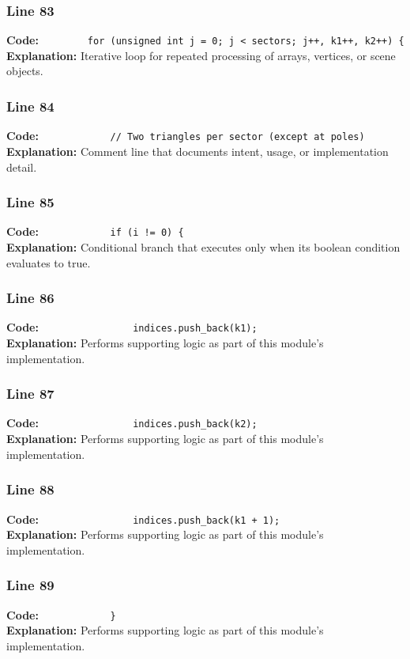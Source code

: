 \documentclass[11pt,a4paper]{article}
\begin{document}
\subsubsection*{Line 83}
\textbf{Code:} \verb|        for (unsigned int j = 0; j < sectors; j++, k1++, k2++) {|\\
\textbf{Explanation:} Iterative loop for repeated processing of arrays, vertices, or scene objects.

\subsubsection*{Line 84}
\textbf{Code:} \verb|            // Two triangles per sector (except at poles)|\\
\textbf{Explanation:} Comment line that documents intent, usage, or implementation detail.

\subsubsection*{Line 85}
\textbf{Code:} \verb|            if (i != 0) {|\\
\textbf{Explanation:} Conditional branch that executes only when its boolean condition evaluates to true.

\subsubsection*{Line 86}
\textbf{Code:} \verb|                indices.push_back(k1);|\\
\textbf{Explanation:} Performs supporting logic as part of this module's implementation.

\subsubsection*{Line 87}
\textbf{Code:} \verb|                indices.push_back(k2);|\\
\textbf{Explanation:} Performs supporting logic as part of this module's implementation.

\subsubsection*{Line 88}
\textbf{Code:} \verb|                indices.push_back(k1 + 1);|\\
\textbf{Explanation:} Performs supporting logic as part of this module's implementation.

\subsubsection*{Line 89}
\textbf{Code:} \verb|            }|\\
\textbf{Explanation:} Performs supporting logic as part of this module's implementation.
\end{document}
